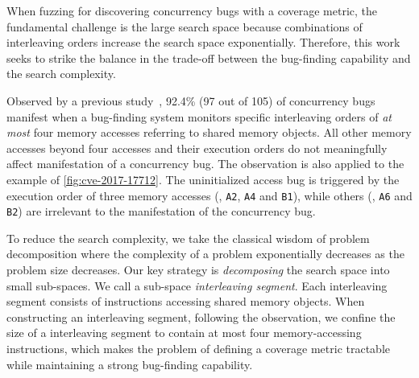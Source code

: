 When fuzzing for discovering concurrency bugs with a coverage metric,
the fundamental challenge is the large search space because
combinations of interleaving orders increase the search space
exponentially.
%
Therefore, this work seeks to strike the balance in the trade-off
between the bug-finding capability and the search complexity.

Observed by a previous study~\cite{learningfrommistakes}, 92.4\% (97
out of 105) of concurrency bugs manifest when a bug-finding system
monitors specific interleaving orders of \textit{at most} four memory
accesses referring to shared memory objects.
%
All other memory accesses beyond four accesses and their execution
orders do not meaningfully affect manifestation of a concurrency bug.
%
The observation is also applied to the example of
\autoref{fig:cve-2017-17712}. The uninitialized access bug is
triggered by the execution order of three memory accesses (\eg,
\texttt{A2}, \texttt{A4} and \texttt{B1}), while others (\eg,
\texttt{A6} and \texttt{B2}) are irrelevant to the manifestation of
the concurrency bug.


%
%
To reduce the search complexity, we take the classical wisdom of
problem decomposition where the complexity of a problem exponentially
decreases as the problem size decreases.
%
Our key strategy is \textit{decomposing} the search space into small
sub-spaces. We call a sub-space \textit{interleaving segment}.
%
Each interleaving segment consists of instructions accessing 
shared memory objects.
%
%
When constructing an interleaving segment, following the observation, 
we confine the size of a interleaving segment 
to contain at most four memory-accessing instructions,
which makes the problem of defining a coverage metric tractable while maintaining a strong bug-finding capability.


